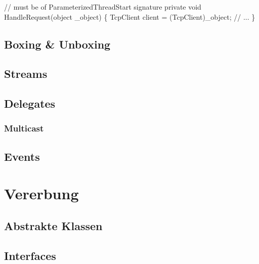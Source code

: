 \documentclass[
  9pt,
  a4paperpaper,
  DIV=11]{scrartcl}
\newenvironment{Shaded}{}{}
\newcommand{\CommentTok}[1]{\textcolor[rgb]{0.42,0.45,0.49}{#1}}
\newcommand{\DataTypeTok}[1]{\textcolor[rgb]{0.84,0.23,0.29}{#1}}
\newcommand{\FunctionTok}[1]{\textcolor[rgb]{0.44,0.26,0.76}{#1}}
\newcommand{\KeywordTok}[1]{\textcolor[rgb]{0.84,0.23,0.29}{#1}}
\newcommand{\NormalTok}[1]{\textcolor[rgb]{0.14,0.16,0.18}{#1}}
\newcommand{\OperatorTok}[1]{\textcolor[rgb]{0.14,0.16,0.18}{#1}}
\numberwithin{equation}{section}
\begin{document}
\begin{multicols}{2}
\begin{Shaded}
\begin{Highlighting}[]
\CommentTok{// must be of ParameterizedThreadStart signature}
\KeywordTok{private} \DataTypeTok{void} \FunctionTok{HandleRequest}\OperatorTok{(}\DataTypeTok{object}\NormalTok{ \_object}\OperatorTok{)}
\OperatorTok{\{}
\NormalTok{  TcpClient client }\OperatorTok{=} \OperatorTok{(}\NormalTok{TcpClient}\OperatorTok{)}\NormalTok{\_object}\OperatorTok{;}
  \CommentTok{// ...}
\OperatorTok{\}}
\end{Highlighting}
\end{Shaded}

\hypertarget{boxing-unboxing}{%
\subsection{Boxing \& Unboxing}\label{boxing-unboxing}}

\hypertarget{streams}{%
\subsection{Streams}\label{streams}}

\hypertarget{delegates}{%
\subsection{Delegates}\label{delegates}}

\hypertarget{multicast}{%
\subsubsection{Multicast}\label{multicast}}

\hypertarget{events}{%
\subsection{Events}\label{events}}

\hypertarget{vererbung}{%
\section{Vererbung}\label{vererbung}}

\hypertarget{abstrakte-klassen}{%
\subsection{Abstrakte Klassen}\label{abstrakte-klassen}}

\hypertarget{interfaces}{%
\subsection{Interfaces}\label{interfaces}}


\end{multicols}
\end{document}
